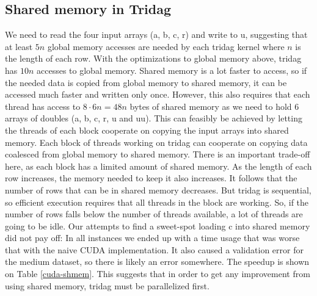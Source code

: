 \documentclass{article}
\begin{document}
\subsection*{Shared memory in Tridag}
We need to read the four input arrays (a, b, c, r) and write to u, suggesting that at least $5n$ global memory accesses are needed by each tridag kernel where $n$ is the length of each row. With the optimizations to global memory above, tridag has $10n$ accesses to global memory. Shared memory is a lot faster to access, so if the needed data is copied from global memory to shared memory, it can be accessed much faster and written only once. However, this also requires that each thread has access to $8 \cdot 6 n = 48n$ bytes of shared memory as we need to hold 6 arrays of doubles (a, b, c, r, u and uu).
\newline\newline
This can feasibly be achieved by letting the threads of each block cooperate on copying the input arrays into shared memory. Each block of threads working on tridag can cooperate on copying data coalesced from global memory to shared memory. There is an important trade-off here, as each block has a limited amount of shared memory. As the length of each row increases, the memory needed to keep it also increases. It follows that the number of rows that can be in shared memory decreases. But tridag is sequential, so efficient execution requires that all threads in the block are working. So, if the number of rows falls below the number of threads available, a lot of threads are going to be idle.
\newline\newline
Our attempts to find a sweet-spot loading c into shared memory did not pay off: In all instances we ended up with a time usage that was worse that with the naive CUDA implementation. It also caused a validation error for the medium dataset, so there is likely an error somewhere. The speedup is shown on Table \ref{cuda-shmem}. 
\newline\newline
This suggests that in order to get any improvement from using shared memory, tridag must be parallelized first.
\end{document}
